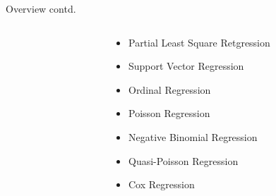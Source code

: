 \documentclass[11pt]{beamer}
\begin{document}
\begin{frame}{
	\begin{minipage}[t]{0.55\textwidth}
		Overview contd.
	\end{minipage}
	\hfill
	\begin{minipage}[t]{0.35\textwidth}
		\flushright
	\end{minipage}
}{}
\begin{columns}
\begin{column}[t]{0.45\textwidth}
\begin{itemize}
		\end{itemize}
		\end{column}
	\begin{column}[t]{0.45\textwidth}
			\begin{itemize}
				\item Partial Least Square Retgression
				\item Support Vector Regression
				\item Ordinal Regression
				\item Poisson Regression
				\item Negative Binomial Regression
				\item Quasi-Poisson Regression
				\item Cox Regression
			\end{itemize}
	\end{column}
\end{columns}

\end{frame}
\end{document}
